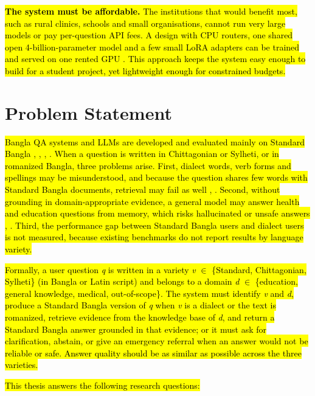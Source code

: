 \hl{\textbf{The system must be affordable.} The institutions that would
benefit most, such as rural clinics, schools and small organisations,
cannot run very large models or pay per-question API fees. A design with
CPU routers, one shared open 4-billion-parameter model and a few small
LoRA adapters can be trained and served on one rented GPU \cite{dettmers2023qlora}. This
approach keeps the system easy enough to build for a student project,
yet lightweight enough for constrained budgets.}

\section{Problem Statement}\label{problem-statement}

\hl{Bangla QA systems and LLMs are developed and evaluated mainly on
Standard Bangla \cite{raihan2025tigerllm}, \cite{ekram2022banglarqa}, \cite{nctbqa}, \cite{shafayat2024benqa}. When a question
is written in Chittagonian or Sylheti, or in romanized Bangla, three
problems arise. First, dialect words, verb forms and spellings may be
misunderstood, and because the question shares few words with Standard
Bangla documents, retrieval may fail as well \cite{jawad2026fivedialects}, \cite{prantik2025}. Second,
without grounding in domain-appropriate evidence, a general model may
answer health and education questions from memory, which risks
hallucinated or unsafe answers \cite{ji2023survey}, \cite{saha2026doctalkbn}. Third, the
performance gap between Standard Bangla users and dialect users is not
measured, because existing benchmarks do not report results by language
variety.}

\hl{Formally, a user question \emph{q} is written in a variety \emph{v}
\ensuremath{\in} \{Standard, Chittagonian, Sylheti\} (in Bangla or Latin script) and
belongs to a domain \emph{d} \ensuremath{\in} \{education, general knowledge, medical,
out-of-scope\}. The system must identify \emph{v} and \emph{d}, produce
a Standard Bangla version of \emph{q} when \emph{v} is a dialect or the
text is romanized, retrieve evidence from the knowledge base of
\emph{d}, and return a Standard Bangla answer grounded in that evidence;
or it must ask for clarification, abstain, or give an emergency referral
when an answer would not be reliable or safe. Answer quality should be
as similar as possible across the three varieties.}

\hl{This thesis answers the following research questions:}

